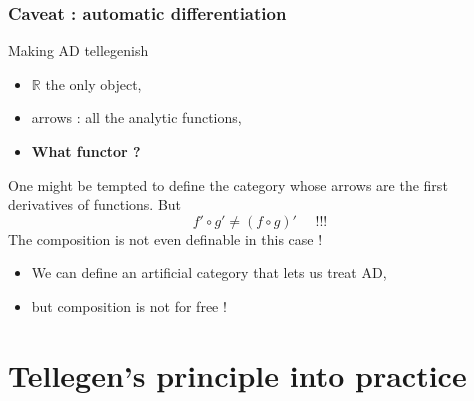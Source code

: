 \documentclass[10pt]{beamer}
\newcommand{\R}{\mathbb{R}}
\begin{document}
\begin{frame}
  \frametitle{Caveat : automatic differentiation}
  
  \begin{block}{Making AD tellegenish}
    \begin{itemize}
    \item $\R$ the only object,
    \item arrows : all the analytic functions,
    \item \textbf{What functor ?}
    \end{itemize}
  \end{block}

  \begin{block}{}
    \begin{center}
      One might be tempted to define the category whose arrows are the
      first derivatives of functions. But
      \[ f'\circ g' \ne (f\circ g)' \quad\text{ !!!}\]
      The composition is not even definable in this case !
    \end{center}
  \end{block}

  \begin{block}{}
    \begin{itemize}
    \item We can define an artificial category that lets us treat AD,
    \item but composition is \alert{not for free} !
    \end{itemize}
  \end{block}
\end{frame}


\section{Tellegen's principle into practice}
\end{document}
